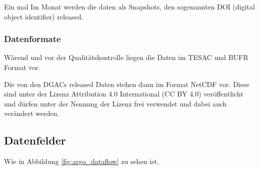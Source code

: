     Ein mal Im Monat werden die daten als Snapshots, den sogenannten DOI (digital object identifier) released. 
    
    \subsubsection{Datenformate}
    
    Wärend und vor der Qualitätskontrolle liegen die Daten im TESAC und BUFR Format vor. 
    
    Die von den DGACs released Daten stehen dann im Format NetCDF vor. Diese sind unter der Lizenz Attribution 4.0 International (CC BY 4.0) veröffentlicht und dürfen unter der Nennung der Lizenz frei verwendet und dabei auch verändert werden.
    
    \cite{ArgoDataDocumentation}
    
    
    
    
    \subsection{Datenfelder}
    
    
    Wie in Abbildung \ref{fig:argo_dataflow} zu sehen ist, 
    
    
